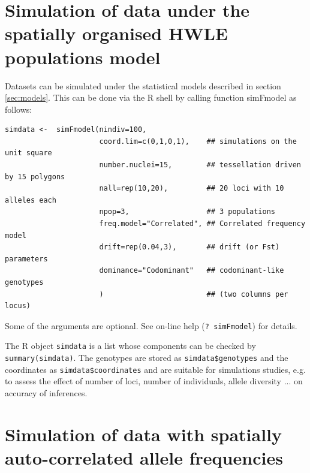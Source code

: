 \documentclass[a4paper,10pt]{article}
\begin{document}

\clearpage


\clearpage
\section{Simulation of data under the spatially organised HWLE populations model}\label{sim-HWLE}

Datasets can be simulated under the statistical models described in section \ref{sec:models}. 
This can be done via the R shell by calling function simFmodel as follows:

\begin{verbatim}
simdata <-  simFmodel(nindiv=100,
                      coord.lim=c(0,1,0,1),    ## simulations on the unit square
                      number.nuclei=15,        ## tessellation driven by 15 polygons
                      nall=rep(10,20),         ## 20 loci with 10 alleles each
                      npop=3,                  ## 3 populations
                      freq.model="Correlated", ## Correlated frequency model 
                      drift=rep(0.04,3),       ## drift (or Fst) parameters
                      dominance="Codominant"   ## codominant-like genotypes 
                      )                        ## (two columns per locus)
\end{verbatim}



Some of the arguments are optional. See on-line help (\texttt{? simFmodel}) for details.

The R object \texttt{simdata} is a list whose components can be checked by \texttt{summary(simdata)}. 
The genotypes are stored as \texttt{simdata\$genotypes} and the coordinates as \texttt{simdata\$coordinates} 
and are suitable for simulations studies, e.g. to assess the effect of number of loci, number of individuals, allele diversity ...
on accuracy of inferences. 


\clearpage
\section[ Spatially correlated frequencies]{Simulation of data with spatially auto-correlated allele frequencies }\label{sim-IBD}
\end{document}
